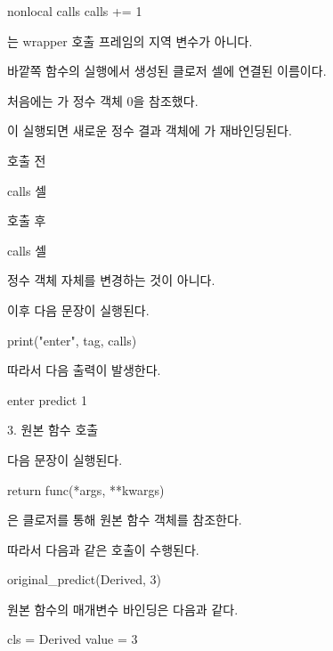 \begin{dhkcode}
nonlocal calls
calls += 1
\end{dhkcode}

는 wrapper 호출 프레임의 지역 변수가 아니다.

바깥쪽  함수의 실행에서 생성된 클로저 셀에 연결된 이름이다.

처음에는 가 정수 객체 0을 참조했다.

이 실행되면 새로운 정수 결과 객체에 가 재바인딩된다.

\begin{dhksmry}
호출 전

calls 셀 

호출 후

calls 셀 
\end{dhksmry}

정수 객체 자체를 변경하는 것이 아니다.

이후 다음 문장이 실행된다.

\begin{dhkcode}
print("enter", tag, calls)
\end{dhkcode}

따라서 다음 출력이 발생한다.

\begin{dhkzsh}
enter predict 1
\end{dhkzsh}

\begin{dhknote}
\begin{dhksmry}[centered]
3. 원본 함수 호출
\end{dhksmry}
\end{dhknote}

다음 문장이 실행된다.

\begin{dhkcode}
return func(*args, **kwargs)
\end{dhkcode}

은 클로저를 통해 원본  함수 객체를 참조한다.

따라서 다음과 같은 호출이 수행된다.

\begin{dhkcode}
original_predict(Derived, 3)
\end{dhkcode}

원본 함수의 매개변수 바인딩은 다음과 같다.

\begin{dhkzsh}
cls = Derived
value = 3
\end{dhkzsh}

